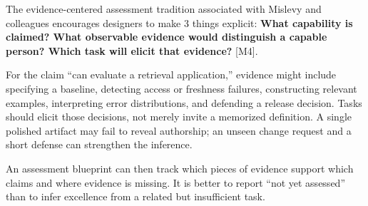 The evidence-centered assessment tradition associated with Mislevy and colleagues encourages designers to make 3 things explicit: \textbf{What capability is claimed? What observable evidence would distinguish a capable person? Which task will elicit that evidence?} [M4].

For the claim ``can evaluate a retrieval application,'' evidence might include specifying a baseline, detecting access or freshness failures, constructing relevant examples, interpreting error distributions, and defending a release decision. Tasks should elicit those decisions, not merely invite a memorized definition. A single polished artifact may fail to reveal authorship; an unseen change request and a short defense can strengthen the inference.

An assessment blueprint can then track which pieces of evidence support which claims and where evidence is missing. It is better to report ``not yet assessed'' than to infer excellence from a related but insufficient task.
